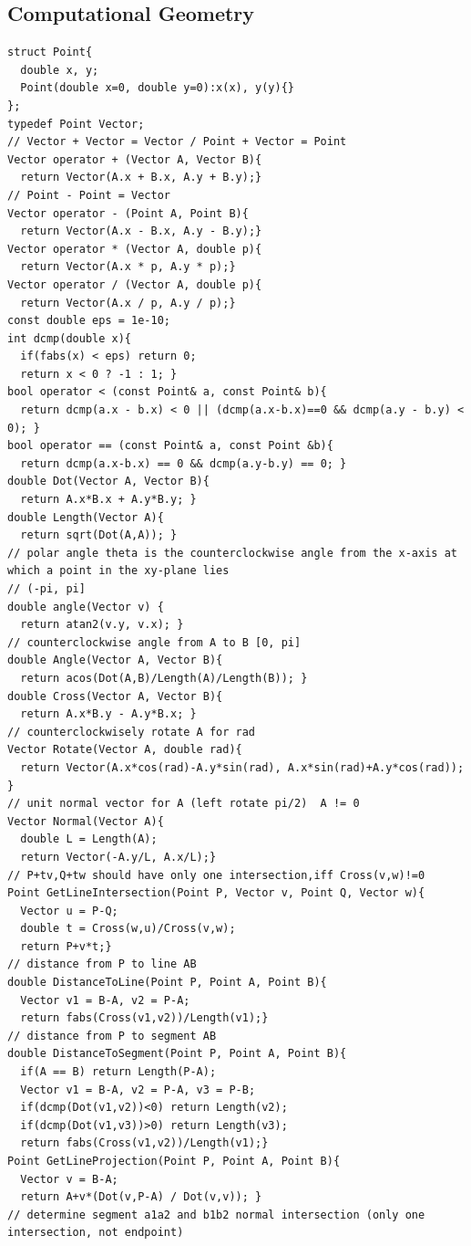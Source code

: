 \documentclass[10pt,landscape]{article}
\begin{document}
\begin{multicols}{2}
\section{Computational Geometry}
\begin{lstlisting}
struct Point{
  double x, y;
  Point(double x=0, double y=0):x(x), y(y){}
};
typedef Point Vector;
// Vector + Vector = Vector / Point + Vector = Point
Vector operator + (Vector A, Vector B){
  return Vector(A.x + B.x, A.y + B.y);}
// Point - Point = Vector
Vector operator - (Point A, Point B){
  return Vector(A.x - B.x, A.y - B.y);}
Vector operator * (Vector A, double p){
  return Vector(A.x * p, A.y * p);}
Vector operator / (Vector A, double p){
  return Vector(A.x / p, A.y / p);}
const double eps = 1e-10;
int dcmp(double x){
  if(fabs(x) < eps) return 0;
  return x < 0 ? -1 : 1; }
bool operator < (const Point& a, const Point& b){
  return dcmp(a.x - b.x) < 0 || (dcmp(a.x-b.x)==0 && dcmp(a.y - b.y) < 0); }
bool operator == (const Point& a, const Point &b){
  return dcmp(a.x-b.x) == 0 && dcmp(a.y-b.y) == 0; }
double Dot(Vector A, Vector B){
  return A.x*B.x + A.y*B.y; }
double Length(Vector A){
  return sqrt(Dot(A,A)); }
// polar angle theta is the counterclockwise angle from the x-axis at which a point in the xy-plane lies
// (-pi, pi]
double angle(Vector v) {
  return atan2(v.y, v.x); }
// counterclockwise angle from A to B [0, pi]
double Angle(Vector A, Vector B){
  return acos(Dot(A,B)/Length(A)/Length(B)); }
double Cross(Vector A, Vector B){
  return A.x*B.y - A.y*B.x; }
// counterclockwisely rotate A for rad
Vector Rotate(Vector A, double rad){
  return Vector(A.x*cos(rad)-A.y*sin(rad), A.x*sin(rad)+A.y*cos(rad)); }
// unit normal vector for A (left rotate pi/2)  A != 0
Vector Normal(Vector A){
  double L = Length(A);
  return Vector(-A.y/L, A.x/L);}
// P+tv,Q+tw should have only one intersection,iff Cross(v,w)!=0
Point GetLineIntersection(Point P, Vector v, Point Q, Vector w){
  Vector u = P-Q;
  double t = Cross(w,u)/Cross(v,w);
  return P+v*t;}
// distance from P to line AB
double DistanceToLine(Point P, Point A, Point B){
  Vector v1 = B-A, v2 = P-A;
  return fabs(Cross(v1,v2))/Length(v1);}
// distance from P to segment AB
double DistanceToSegment(Point P, Point A, Point B){
  if(A == B) return Length(P-A);
  Vector v1 = B-A, v2 = P-A, v3 = P-B;
  if(dcmp(Dot(v1,v2))<0) return Length(v2);
  if(dcmp(Dot(v1,v3))>0) return Length(v3);
  return fabs(Cross(v1,v2))/Length(v1);}
Point GetLineProjection(Point P, Point A, Point B){
  Vector v = B-A;
  return A+v*(Dot(v,P-A) / Dot(v,v)); }
// determine segment a1a2 and b1b2 normal intersection (only one intersection, not endpoint)

\end{lstlisting}
\end{multicols}
\end{document}
